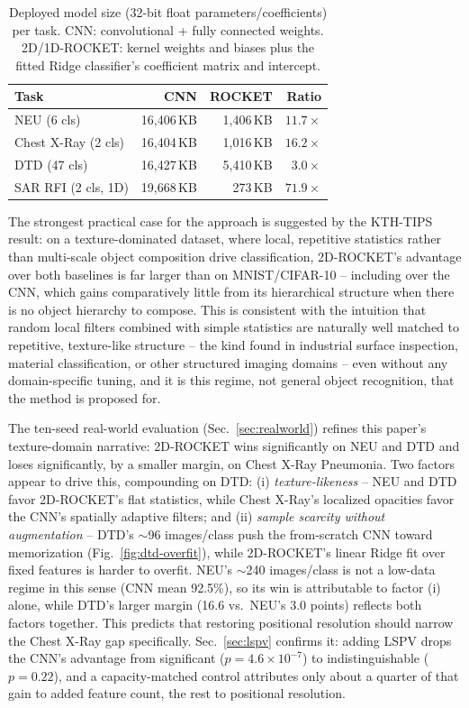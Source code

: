\documentclass[a4paper,fleqn]{cas-sc}
\begin{document}
\begin{table}
\caption{Deployed model size (32-bit float parameters/coefficients) per task. CNN: convolutional + fully connected weights. 2D/1D-ROCKET: kernel weights and biases plus the fitted Ridge classifier's coefficient matrix and intercept.}\label{tbl:modelsize}
\begin{tabular*}{\tblwidth}{@{}lrrr@{}}
\toprule
Task & CNN & ROCKET & Ratio \\
\midrule
NEU (6 cls)         & 16{,}406\,KB & 1{,}406\,KB & $11.7\times$ \\
Chest X-Ray (2 cls) & 16{,}404\,KB & 1{,}016\,KB & $16.2\times$ \\
DTD (47 cls)        & 16{,}427\,KB & 5{,}410\,KB & $3.0\times$ \\
SAR RFI (2 cls, 1D) & 19{,}668\,KB & 273\,KB     & $71.9\times$ \\
\bottomrule
\end{tabular*}
\end{table}

The strongest practical case for the approach is suggested by the KTH-TIPS result: on a texture-dominated dataset, where local, repetitive statistics rather than multi-scale object composition drive classification, 2D-ROCKET's advantage over both baselines is far larger than on MNIST/CIFAR-10 -- including over the CNN, which gains comparatively little from its hierarchical structure when there is no object hierarchy to compose. This is consistent with the intuition that random local filters combined with simple statistics are naturally well matched to repetitive, texture-like structure -- the kind found in industrial surface inspection, material classification, or other structured imaging domains -- even without any domain-specific tuning, and it is this regime, not general object recognition, that the method is proposed for.

The ten-seed real-world evaluation (Sec.~\ref{sec:realworld}) refines this paper's texture-domain narrative: 2D-ROCKET wins significantly on NEU and DTD and loses significantly, by a smaller margin, on Chest X-Ray Pneumonia. Two factors appear to drive this, compounding on DTD: (i) \emph{texture-likeness} -- NEU and DTD favor 2D-ROCKET's flat statistics, while Chest X-Ray's localized opacities favor the CNN's spatially adaptive filters; and (ii) \emph{sample scarcity without augmentation} -- DTD's $\sim$96 images/class push the from-scratch CNN toward memorization (Fig.~\ref{fig:dtd-overfit}), while 2D-ROCKET's linear Ridge fit over fixed features is harder to overfit. NEU's $\sim$240 images/class is not a low-data regime in this sense (CNN mean 92.5\%), so its win is attributable to factor (i) alone, while DTD's larger margin (16.6 vs.\ NEU's 3.0 points) reflects both factors together. This predicts that restoring positional resolution should narrow the Chest X-Ray gap specifically. Sec.~\ref{sec:lspv} confirms it: adding LSPV drops the CNN's advantage from significant ($p=4.6\times10^{-7}$) to indistinguishable ($p=0.22$), and a capacity-matched control attributes only about a quarter of that gain to added feature count, the rest to positional resolution.
\end{document}
